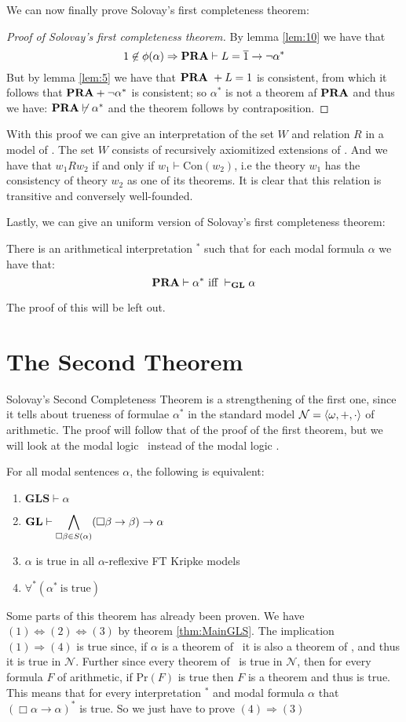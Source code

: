 \documentclass[../main.tex]{subfiles}
\begin{document}
We can now finally prove Solovay's first completeness theorem:
\begin{proof}[Proof of Solovay's first completeness theorem]
	By lemma \ref{lem:10} we have that
	\[1\not\in\phi(\alpha)\Rightarrow\text{\textbf{PRA}}\vdash L=\overline
	1\rightarrow\neg\alpha^*\]
	But by lemma \ref{lem:5} we have that $\text{\textbf{PRA}}\ +L=1$ is consistent, from
	which it follows that $\text{\textbf{PRA}}+\neg\alpha^*$ is consistent; so $\alpha^*$
	is not a theorem af $\text{\textbf{PRA}}$ and thus we have:
	$\text{\textbf{PRA}}\not\vdash\alpha^*$ and the theorem follows by contraposition.
\end{proof}

With this proof we can give an interpretation of the set $W$ and relation $R$ in
a model of \GL. The set $W$ consists of recursively axiomitized extensions of
\PRA. And we have that $w_1Rw_2$ if and only if $w_1\vdash\text{Con}(w_2)$,
i.e the theory $w_1$ has the consistency of theory $w_2$ as one of its
theorems. It is clear that this relation is transitive and conversely
well-founded.

Lastly, we can give an uniform version of Solovay's first completeness theorem:
\begin{thm}
	There is an arithmetical interpretation $^*$ such that for each modal
	formula $\alpha$ we have that:
	\[\PRA\vdash\alpha^*\ \text{iff}\ \vdash_\GL\alpha\]
\end{thm}
The proof of this will be left out.
\section{The Second Theorem}
\label{chap:second}
Solovay's Second Completeness Theorem is a strengthening of the first one,
since it tells about trueness of formulae $\alpha^*$ in the standard model
$\mathcal{N}=\langle
\omega,+,\cdot\rangle$ of arithmetic. The proof will follow that of the proof of
the first
theorem, but we will look at the modal logic \GLS\ instead of the modal logic
\GL.
\begin{thm}
	For all modal sentences $\alpha$, the following is equivalent:
	\begin{enumerate}
		\item $\textbf{GLS}\vdash\alpha$
		\item $\text{\textbf{GL}}\vdash\displaystyle\bigwedge_{\Box \beta\in
			S(\alpha)}(\Box\beta\rightarrow\beta)\rightarrow\alpha$
		\item $\alpha$ is true in all $\alpha$-reflexive FT Kripke models
		\item $\forall^*(\alpha^*\ \text{is true})$
	\end{enumerate}
\end{thm}
Some parts of this theorem has already been proven. We have
$(1)\Leftrightarrow(2)\Leftrightarrow(3)$ by theorem \ref{thm:MainGLS}. The
implication $(1)\Rightarrow(4)$ is true since, if $\alpha$ is a theorem of \GL\
it is also a theorem of \PRA, and thus it is true in $\mathcal{N}$. Further
since every theorem of \PRA\ is true in $\mathcal{N}$, then for every formula $F$ of
arithmetic, if $\text{Pr}(F)$ is true then $F$ is a theorem and thus is true.
This means that for every interpretation $^*$ and modal formula $\alpha$ that
$(\Box\alpha\rightarrow\alpha)^*$ is true. So we just have to prove
$(4)\Rightarrow(3)$
\end{document}
